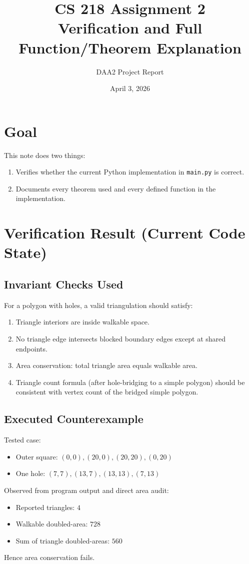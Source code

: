 \documentclass[11pt]{article}
\title{CS 218 Assignment 2\\Verification and Full Function/Theorem Explanation}
\author{DAA2 Project Report}
\date{April 3, 2026}
\begin{document}
\maketitle

\section{Goal}
This note does two things:
\begin{enumerate}
  \item Verifies whether the current Python implementation in \texttt{main.py} is correct.
  \item Documents every theorem used and every defined function in the implementation.
\end{enumerate}

\section{Verification Result (Current Code State)}
\subsection{Invariant Checks Used}
For a polygon with holes, a valid triangulation should satisfy:
\begin{enumerate}
  \item Triangle interiors are inside walkable space.
  \item No triangle edge intersects blocked boundary edges except at shared endpoints.
  \item Area conservation: total triangle area equals walkable area.
  \item Triangle count formula (after hole-bridging to a simple polygon) should be consistent with vertex count of the bridged simple polygon.
\end{enumerate}

\subsection{Executed Counterexample}
Tested case:
\begin{itemize}
  \item Outer square: $(0,0),(20,0),(20,20),(0,20)$
  \item One hole: $(7,7),(13,7),(13,13),(7,13)$
\end{itemize}
Observed from program output and direct area audit:
\begin{itemize}
  \item Reported triangles: $4$
  \item Walkable doubled-area: $728$
  \item Sum of triangle doubled-areas: $560$
\end{itemize}
Hence area conservation fails.
\end{document}
